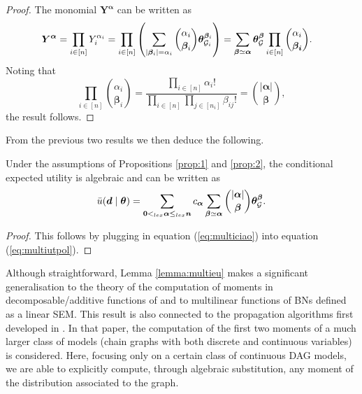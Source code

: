 \begin{proof} The monomial $\bm{Y}^{\bm{\alpha}}$ can be written as
\begin{align*}
\bm{Y}^{\bm{\alpha}}&=\prod_{i\in[n]}Y_i^{\alpha_i}=\prod_{i\in[n]}\left(\sum_{|\bm{\beta}_i|=\alpha_i}\binom{\alpha_i}{\bm{\beta}_i}\bm{\theta}_{\mathcal{G}_i}^{\bm{\beta}_i}\right)=\sum_{\bm{\beta}\simeq \bm{\alpha}}\bm{\theta}_{\mathcal{G}}^{\bm{\beta}}\prod_{i\in[n]}\binom{\alpha_i}{\bm{\beta_i}}.
\end{align*}
Noting that 
\begin{equation*}
\prod_{i\in[n]}\binom{\alpha_i}{\bm{\beta}_i}=\frac{\prod_{i\in[n]}\alpha_i!}{\prod_{i\in[n]}\prod_{j\in[n_i]}\beta_{ij}!}=\binom{|\bm{\alpha}|}{\bm{\beta}},
\end{equation*}
the result follows.
\end{proof}

From the previous two results we then deduce the following.
\begin{lemma}
\label{lemma:multieu}
Under the assumptions of Propositions \ref{prop:1} and \ref{prop:2}, the conditional expected utility is algebraic and can be written as
\begin{equation}
\label{eq:multieu}
\bar{u}(\bm{d}\;|\;\bm{\theta})=\sum_{\bm{0}<_{lex}\bm{\alpha}\leq_{lex}\bm{n}}c_{\bm{\alpha}}\sum_{\bm{\beta}\simeq \bm{\alpha}}\binom{|\bm{\alpha}|}{\bm{\beta}}\bm{\theta}_{\Gr}^{\bm{\beta}}.
\end{equation}
\end{lemma}

\begin{proof}
This follows by plugging in equation (\ref{eq:multiciao}) into equation (\ref{eq:multiutpol}).
\end{proof}

Although straightforward, Lemma \ref{lemma:multieu} makes a significant generalisation to the theory of the computation of moments in decomposable/additive functions of \citet{Cowell1999a} and \citet{Nilsson2001} to multilinear functions of BNs defined as a linear SEM. This result is also connected to the propagation algorithms first developed in \citet{Lauritzen1992}. In that paper, the computation of the first two moments of a much larger class of models (chain graphs with both discrete and continuous variables) is considered. Here, focusing only on a certain class of continuous DAG models, we are able to explicitly compute, through algebraic substitution, any moment of the distribution associated to the graph.  

